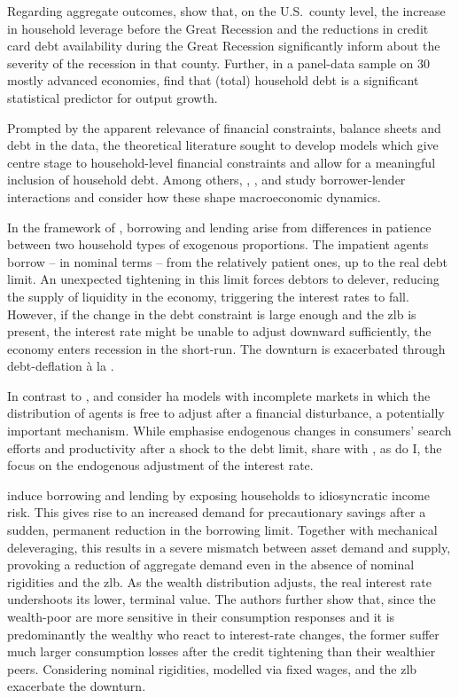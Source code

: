 \documentclass[a4paper,12pt]{article} %
\numberwithin{equation}{section} %
\numberwithin{figure}{section}
\numberwithin{table}{section}
\begin{document}
Regarding aggregate outcomes, \textcite{mian2010} show that, on the U.S.~county level, the increase in household leverage before the Great Recession and the reductions in credit card debt availability during the Great Recession significantly inform about the severity of the recession in that county. Further, in a panel-data sample on 30 mostly advanced economies, \textcite{mian2017} find that (total) household debt is a significant statistical predictor for output growth.

Prompted by the apparent relevance of financial constraints, balance sheets and debt in the data, the theoretical literature sought to develop models which give centre stage to household-level financial constraints and allow for a meaningful inclusion of household debt. Among others, \textcite{egg2012}, \textcite{riosrull2015}, \textcite{justiniano2015} and \textcite{gl2017} study borrower-lender interactions and consider how these shape macroeconomic dynamics.

In the framework of \textcite{egg2012}, borrowing and lending arise from differences in patience between two household types of exogenous proportions. The impatient agents borrow -- in nominal terms -- from the relatively patient ones, up to the real debt limit. An unexpected tightening in this limit forces debtors to delever, reducing the supply of liquidity in the economy, triggering the interest rates to fall. However, if the change in the debt constraint is large enough and the \Gls{zlb} is present, the interest rate might be unable to adjust downward sufficiently, the economy enters recession in the short-run. The downturn is exacerbated through debt-deflation à la \textcite{fisher1933}.

In contrast to \textcite{egg2012}, \textcite{riosrull2015} and \textcite{gl2017} consider \Gls{ha} models with incomplete markets in which the distribution of agents is free to adjust after a financial disturbance, a potentially important mechanism. While \textcite{riosrull2015} emphasise endogenous changes in consumers' search efforts and productivity after a shock to the debt limit, \textcite{gl2017} share with \textcite{egg2012}, as do I, the focus on the endogenous adjustment of the interest rate.

\textcite{gl2017} induce borrowing and lending by exposing households to idiosyncratic income risk. This gives rise to an increased demand for precautionary savings after a sudden, permanent reduction in the borrowing limit. Together with mechanical deleveraging, this results in a severe mismatch between asset demand and supply, provoking a reduction of aggregate demand even in the absence of nominal rigidities and the \Gls{zlb}. As the wealth distribution adjusts, the real interest rate undershoots its lower, terminal value. The authors further show that, since the wealth-poor are more sensitive in their consumption responses and it is predominantly the wealthy who react to interest-rate changes, the former suffer much larger consumption losses after the credit tightening than their wealthier peers. Considering nominal rigidities, modelled via fixed wages, and the \Gls{zlb} exacerbate the downturn. 
\end{document}
